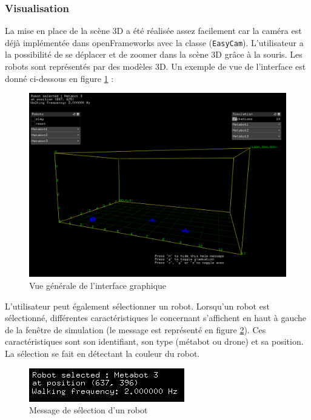 \subsubsection{Visualisation}

La mise en place de la scène 3D a été réalisée assez facilement car la caméra est déjà implémentée dans openFrameworks avec la classe (\verb|EasyCam|). L'utilisateur a la possibilité de se déplacer et de zoomer dans la scène 3D grâce à la souris. Les robots sont représentés par des modèles 3D. Un exemple de vue de l'interface est donné ci-dessous en figure \ref{interface} :

\begin{figure}[H]
\centering
\includegraphics[scale=0.4]{imgs/view2}
\caption{Vue générale de l'interface graphique}
\label{interface}
\end{figure}

L'utilisateur peut également sélectionner un robot. Lorsqu'un robot est sélectionné, différentes caractéristiques le concernant s'affichent en haut à gauche de la fenêtre de simulation (le message est représenté en figure \ref{mselec}). Ces caractéristiques sont son identifiant, son type (métabot ou drone) et sa position. La sélection se fait en détectant la couleur du robot.

\begin{figure}[H]
\centering
\includegraphics[scale=1]{imgs/selection}
\caption{Message de sélection d'un robot}
\label{mselec}
\end{figure}

